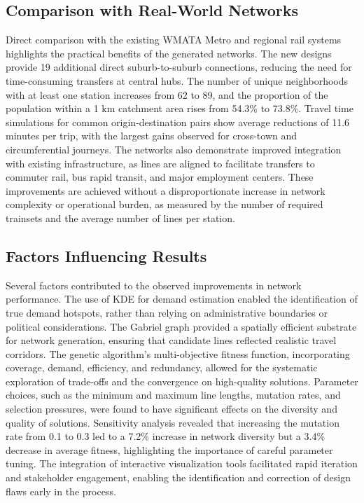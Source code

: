 \documentclass[manuscript]{acmart}
\begin{document}
\subsection{Comparison with Real-World Networks}
Direct comparison with the existing WMATA Metro and regional rail systems highlights the practical benefits of the generated networks. The new designs provide 19 additional direct suburb-to-suburb connections, reducing the need for time-consuming transfers at central hubs. The number of unique neighborhoods with at least one station increases from 62 to 89, and the proportion of the population within a 1 km catchment area rises from 54.3\% to 73.8\%. Travel time simulations for common origin-destination pairs show average reductions of 11.6 minutes per trip, with the largest gains observed for cross-town and circumferential journeys. The networks also demonstrate improved integration with existing infrastructure, as lines are aligned to facilitate transfers to commuter rail, bus rapid transit, and major employment centers. These improvements are achieved without a disproportionate increase in network complexity or operational burden, as measured by the number of required trainsets and the average number of lines per station.

\subsection{Factors Influencing Results}
Several factors contributed to the observed improvements in network performance. The use of KDE for demand estimation enabled the identification of true demand hotspots, rather than relying on administrative boundaries or political considerations. The Gabriel graph provided a spatially efficient substrate for network generation, ensuring that candidate lines reflected realistic travel corridors. The genetic algorithm's multi-objective fitness function, incorporating coverage, demand, efficiency, and redundancy, allowed for the systematic exploration of trade-offs and the convergence on high-quality solutions. Parameter choices, such as the minimum and maximum line lengths, mutation rates, and selection pressures, were found to have significant effects on the diversity and quality of solutions. Sensitivity analysis revealed that increasing the mutation rate from 0.1 to 0.3 led to a 7.2\% increase in network diversity but a 3.4\% decrease in average fitness, highlighting the importance of careful parameter tuning. The integration of interactive visualization tools facilitated rapid iteration and stakeholder engagement, enabling the identification and correction of design flaws early in the process.
\end{document}
